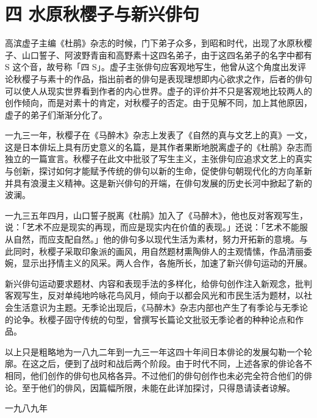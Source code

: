 \section*{\FS 四 水原秋樱子与新兴俳句}

 {\FS
  高滨虚子主编《杜鹃》杂志的时候，门下弟子众多，到昭和时代，出现了水原秋樱子、山口誓子、阿波野青亩和高野素十这四名弟子，由于这四名弟子的名字中都有 S 这个音，故号称「四 S」。虚子主张俳句应客观地写生，他曾从这个角度出发评论秋樱子与素十的作品，指出前者的俳句是表现理想即内心欲求之作，后者的俳句可以使人从现实世界看到作者的内心世界。虚子的评价并不只是客观地比较两人的创作倾向，而是对素十的肯定，对秋樱子的否定。由于见解不同，加上其他原因，虚子的弟子们渐渐分化了。

  一九三一年，秋樱子在《马醉木》杂志上发表了《自然的真与文艺上的真》一文，这是日本俳坛上具有历史意义的名篇，是其作者果断地脱离虚子的《杜鹃》杂志而独立的一篇宣言。秋樱子在此文中批驳了写生主义，主张俳句应追求文艺上的真实与创新，探讨如何才能赋予传统的俳句以新的生命，促使俳句朝现代化的方向革新并具有浪漫主义精神。这是新兴俳句的开端，在俳句发展的历史长河中掀起了新的波澜。

  一九三五年四月，山口誓子脱离《杜鹃》加入了《马醉木》，他也反对客观写生，说：「艺术不应是现实的再现，而应是现实内在价值的表现。」还说：「艺术不能服从自然，而应支配自然。」他的俳句多以现代生活为素材，努力开拓新的意境。与此同时，秋樱子采取印象派的画风，用自然题材熏陶俳人的主观情愫，作品清丽委婉，显示出抒情主义的风采。两人合作，各施所长，加速了新兴俳句运动的开展。

  新兴俳句运动要求题材、内容和表现手法的多样化，给俳句创作注入新观念，批判客观写生，反对单纯地吟咏花鸟风月，倾向于以都会风光和市民生活为题材，以社会生活意识为主题。无季论出现后，《马醉木》杂志内部也产生了有季论与无季论的论争。秋樱子固守传统的句型，曾撰写长篇论文批驳无季论者的种种论点和作品。

  以上只是粗略地为一八九二年到一九三一年这四十年间日本俳论的发展勾勒一个轮廓。在这之后，便到了战时和战后两个阶段。由于时代不同，上述各家的俳论各不相同，他们创作的俳句也风格各异。不过他们的俳句创作也未必完全符合他们的俳论。至于他们的俳风，因篇幅所限，未能在此详加探讨，只得恳请读者谅解。

  \hfill 一九八九年
 }
